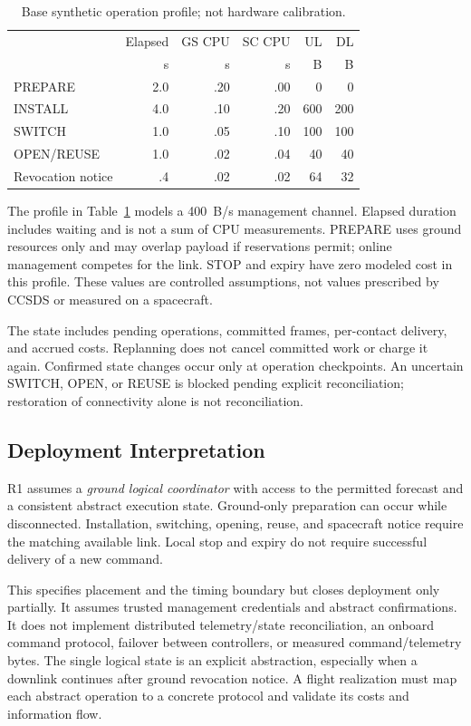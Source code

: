 \documentclass[conference]{IEEEtran}
\begin{document}
\begin{table}[t]
\centering\small
\caption{Base synthetic operation profile; not hardware calibration.}
\label{tab:costs}
\setlength{\tabcolsep}{4pt}
\begin{tabular}{lrrrrr}
\toprule
 & Elapsed & GS CPU & SC CPU & UL & DL \\
 & s & s & s & B & B \\
\midrule
PREPARE & 2.0 & .20 & .00 & 0 & 0 \\
INSTALL & 4.0 & .10 & .20 & 600 & 200 \\
SWITCH & 1.0 & .05 & .10 & 100 & 100 \\
OPEN/REUSE & 1.0 & .02 & .04 & 40 & 40 \\
Revocation notice & .4 & .02 & .02 & 64 & 32 \\
\bottomrule
\end{tabular}
\end{table}

The profile in Table~\ref{tab:costs} models a 400~B/s management channel. Elapsed duration includes waiting and is not a sum of CPU measurements. PREPARE uses ground resources only and may overlap payload if reservations permit; online management competes for the link. STOP and expiry have zero modeled cost in this profile. These values are controlled assumptions, not values prescribed by CCSDS or measured on a spacecraft.

The state includes pending operations, committed frames, per-contact delivery, and accrued costs. Replanning does not cancel committed work or charge it again. Confirmed state changes occur only at operation checkpoints. An uncertain SWITCH, OPEN, or REUSE is blocked pending explicit reconciliation; restoration of connectivity alone is not reconciliation.

\subsection{Deployment Interpretation}
R1 assumes a \emph{ground logical coordinator} with access to the permitted forecast and a consistent abstract execution state. Ground-only preparation can occur while disconnected. Installation, switching, opening, reuse, and spacecraft notice require the matching available link. Local stop and expiry do not require successful delivery of a new command.

This specifies placement and the timing boundary but closes deployment only partially. It assumes trusted management credentials and abstract confirmations. It does not implement distributed telemetry/state reconciliation, an onboard command protocol, failover between controllers, or measured command/telemetry bytes. The single logical state is an explicit abstraction, especially when a downlink continues after ground revocation notice. A flight realization must map each abstract operation to a concrete protocol and validate its costs and information flow.
\end{document}
